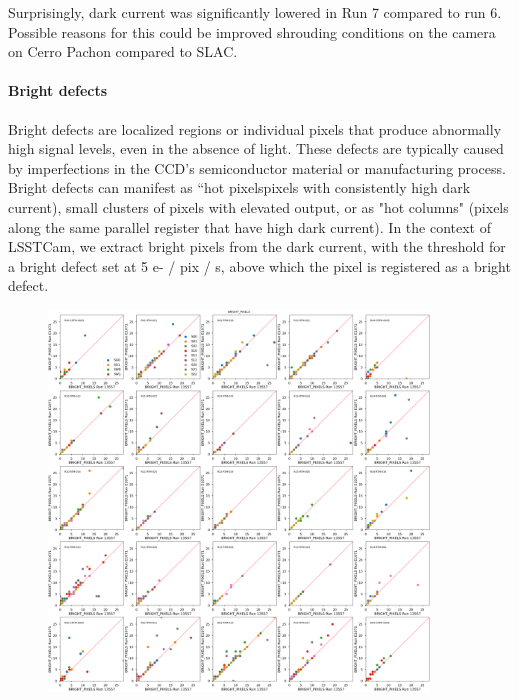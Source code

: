 Surprisingly, dark current was significantly lowered in Run 7 compared
to run 6. Possible reasons for this could be improved shrouding
conditions on the camera on Cerro Pachon compared to SLAC.

\paragraph{Bright defects}\label{bright-defects}

Bright defects are localized regions or individual pixels that produce
abnormally high signal levels, even in the absence of light. These
defects are typically caused by imperfections in the CCD's semiconductor
material or manufacturing process. Bright defects can manifest as ``hot
pixelspixels with consistently high dark current), small clusters of
pixels with elevated output, or as "hot columns" (pixels along the same
parallel register that have high dark current). In the context of
LSSTCam, we extract bright pixels from the dark current, with the
threshold for a bright defect set at 5 e- / pix / s, above which the
pixel is registered as a bright defect.

\begin{figure}
\begin{centering}
\includegraphics[width=0.9\textwidth]{sections/figures/baselineCharacterization/13557_E1071_BRIGHT_PIXELS.png}
\end{centering}
\end{figure}

